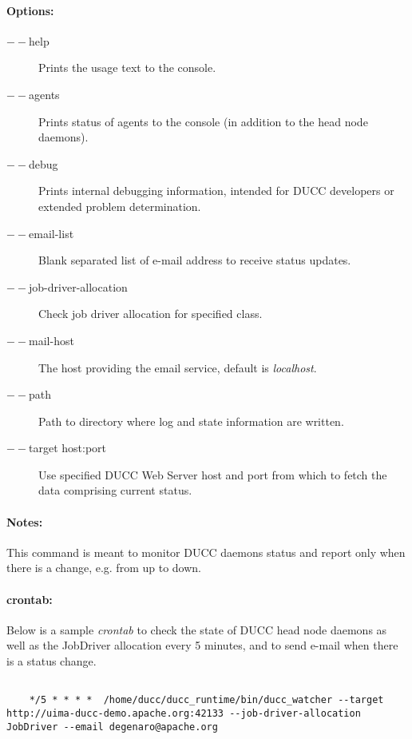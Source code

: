   \paragraph{Options:}
    \begin{description}
    	\item[$--$help]
          Prints the usage text to the console. 
        \item[$--$agents]
          Prints status of agents to the console (in addition to the head node daemons). 
        \item[$--$debug]          
          Prints internal debugging information, intended for DUCC developers or extended problem determination.      
        \item[$--$email-list]          
          Blank separated list of e-mail address to receive status updates.  
        \item[$--$job-driver-allocation]          
          Check job driver allocation for specified class.     
        \item[$--$mail-host]          
          The host providing the email service, default is {\em localhost}.     
        \item[$--$path]          
          Path to directory where log and state information are written.  
        \item[$--$target host:port]          
          Use specified DUCC Web Server host and port from which to fetch the data comprising current status.                                                                                               
     \end{description}
            
  \paragraph{Notes:}
    This command is meant to monitor DUCC daemons status and report only when there is a change, e.g. from up to down.
  
  \paragraph{crontab:}
  
    Below is a sample {\em crontab} to check the state of DUCC head node daemons as well as
    the JobDriver allocation every 5 minutes, and to send e-mail when there is a status change.
    
    \begin{verbatim}
    
    */5 * * * *  /home/ducc/ducc_runtime/bin/ducc_watcher --target http://uima-ducc-demo.apache.org:42133 --job-driver-allocation JobDriver --email degenaro@apache.org
    
    \end{verbatim}